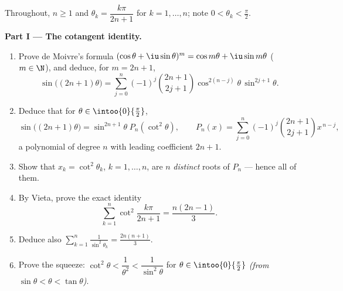 \begin{problem}[{Weekend problem --- $\zeta(2) = \pi^2/6$ and the
Bertrand panorama}]
\label{pb:b2:series:1}
Throughout, $n \geq 1$ and $\theta_k = \dfrac{k\pi}{2n+1}$ for $k
= 1, \dots, n$; note $0 < \theta_k < \frac\pi2$.

\medskip
\noindent\textbf{Part I --- The cotangent identity.}
\begin{enumerate}
  \item Prove de Moivre's formula $(\cos\theta +
        \iu\sin\theta)^m = \cos m\theta + \iu\sin m\theta$ ($m
        \in \N$), and deduce, for $m = 2n + 1$,
        \[
        \sin\bigl((2n{+}1)\theta\bigr) = \sum_{j=0}^{n}
        (-1)^j\binom{2n+1}{2j+1}\cos^{2(n-j)}\theta\,
        \sin^{2j+1}\theta .
        \]
  \item Deduce that for $\theta \in \intoo{0}{\frac\pi2}$,
        \[
        \sin\bigl((2n{+}1)\theta\bigr) =
        \sin^{2n+1}\theta\; P_n(\cot^2\theta),
        \qquad
        P_n(x) = \sum_{j=0}^{n}
        (-1)^j\binom{2n+1}{2j+1}x^{\,n-j},
        \]
        a polynomial of degree $n$ with leading coefficient $2n
        + 1$.
  \item Show that $x_k = \cot^2\theta_k$, $k = 1, \dots, n$, are
        $n$ \emph{distinct} roots of $P_n$ --- hence all of
        them.
  \item By Vieta, prove the exact identity
        \[
        \sum_{k=1}^{n} \cot^2\frac{k\pi}{2n+1}
        = \frac{n(2n-1)}{3}.
        \]
  \item Deduce also $\displaystyle\sum_{k=1}^{n}
        \frac{1}{\sin^2\theta_k} = \frac{2n(n+1)}{3}$.
  \item Prove the squeeze: $\cot^2\theta < \dfrac1{\theta^2} <
        \dfrac{1}{\sin^2\theta}$ for $\theta \in
        \intoo{0}{\frac\pi2}$ \emph{(from $\sin\theta < \theta <
        \tan\theta$)}.
\end{enumerate}


\end{problem}
